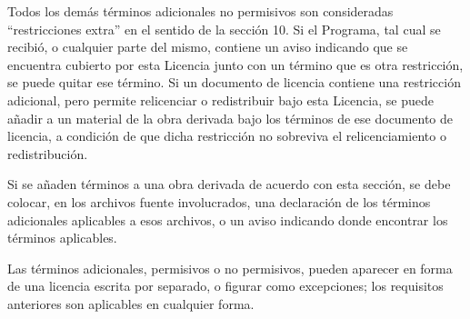 \documentclass[11pt]{article}
\begin{document}
\begin{enumerate}
Todos los dem\'{a}s t\'{e}rminos adicionales no permisivos son consideradas 
``restricciones extra'' en el sentido de la secci\'{o}n 10. Si el Programa, tal cual se 
recibi\'{o}, o cualquier parte del mismo, contiene un aviso indicando que se 
encuentra cubierto por esta Licencia junto con un t\'{e}rmino que es otra restricci\'{o}n,
se puede quitar ese t\'{e}rmino. Si un documento de licencia contiene una restricci\'{o}n
adicional, pero permite relicenciar o redistribuir bajo esta Licencia, se puede 
a\~nadir a un material de la obra derivada bajo los t\'{e}rminos de ese documento de 
licencia, a condici\'{o}n de que dicha restricci\'{o}n no sobreviva el relicenciamiento 
o redistribuci\'{o}n.

Si se a\~naden t\'{e}rminos a una obra derivada de acuerdo con esta secci\'{o}n, se debe 
colocar, en los archivos fuente involucrados, una declaraci\'{o}n de los t\'{e}rminos adicionales aplicables a esos archivos, o un aviso indicando donde encontrar los t\'{e}rminos aplicables.

Las t\'{e}rminos adicionales, permisivos o no permisivos, pueden aparecer en forma de 
una licencia escrita por separado, o figurar como excepciones; los requisitos anteriores son aplicables en cualquier forma.

\end{enumerate}
\end{document}
